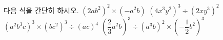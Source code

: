 다음 식을 간단히 하시오.
 $(2ab^2)^2\times(-a^2b)$
 $(4x^3y^2)^3\div(2xy^3)^2$
 $(a^2b^3c)^3\times(bc^2)^3\div(ac)^4$
 $\left(\dfrac{2}{3}a^2b\right)^3\div(a^3b)^2\times\left(-\dfrac{1}{2}b^2\right)^3$
